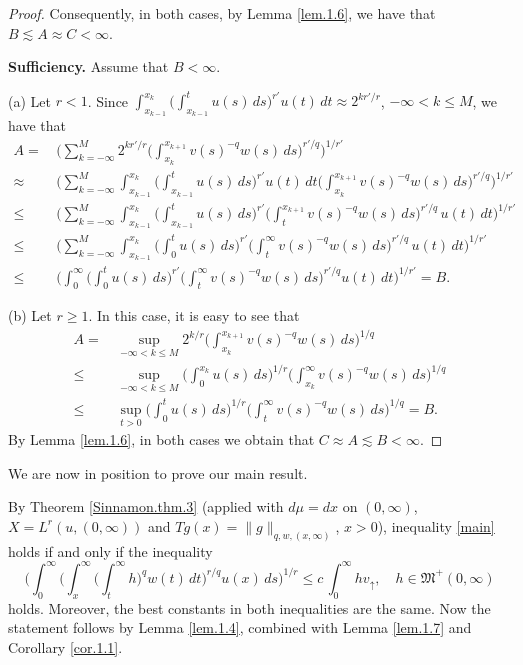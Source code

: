 \documentclass[12pt]{amsart}
\theoremstyle{plain}
\theoremstyle{definition}
\numberwithin{thm}{section}
\numberwithin{equation}{section}
\begin{document}
\begin{proof}
	Consequently, in both cases, by Lemma \ref{lem.1.6}, we have that $B \lesssim A \approx C < \infty$.
	
    {\bf Sufficiency.} Assume that $B < \infty$.
    
   	{\rm (a)} Let $r < 1$. Since $\int_{x_{k-1}}^{x_k} \bigg( \int_{x_{k-1}}^t u(s)\,ds \bigg)^{r'} u(t)\,dt \approx 2^{k r' / r}$, ${-\infty < k \le M}$, we have that
   	\begin{align*}
   	A = & \, \bigg( \sum_{k = -\infty}^M 2^{k r' / r} \bigg( \int_{x_k}^{x_{k+1}} v(s)^{-q} w(s)\,ds\bigg)^{ r' / q} \bigg)^{1/r'} \\
   	\approx & \, \bigg( \sum_{k = -\infty}^M \int_{x_{k-1}}^{x_k} \bigg( \int_{x_{k-1}}^t u(s)\,ds \bigg)^{r'} u(t)\,dt \bigg( \int_{x_k}^{x_{k+1}} v(s)^{-q} w(s)\,ds\bigg)^{ r' / q} \bigg)^{1/r'} \\
   	\le & \, \bigg( \sum_{k = -\infty}^M \int_{x_{k-1}}^{x_k} \bigg( \int_{x_{k-1}}^t u(s)\,ds \bigg)^{r'} \bigg( \int_t^{x_{k+1}} v(s)^{-q} w(s)\,ds\bigg)^{ r' / q} \,u(t)\,dt  \bigg)^{1/r'} \\
   	\le & \, \bigg( \sum_{k = -\infty}^M \int_{x_{k-1}}^{x_k} \bigg( \int_0^t u(s)\,ds \bigg)^{r'} \bigg( \int_t^{\infty} v(s)^{-q} w(s)\,ds\bigg)^{ r' / q} \,u(t)\,dt \bigg)^{1/r'} \\
   	\le & \, \bigg( \int_0^{\infty} \bigg( \int_0^t u(s)\,ds\bigg)^{r'} \bigg( \int_t^{\infty} v(s)^{-q} w(s)\,ds \bigg)^{ r' / q}u(t)\,dt \bigg)^{1/r'} = B.
   	\end{align*}
   	
	{\rm (b)} Let $r \ge 1$. In this case, it is easy to see that
	\begin{align*}
	A = & \, \sup_{-\infty < k \le M} 2^{k / r} \bigg( \int_{x_k}^{x_{k+1}} v(s)^{-q} w(s)\,ds\bigg)^{ 1 / q} \\
	\le & \, \sup_{-\infty < k \le M} \bigg( \int_0^{x_k} u(s)\,ds \bigg)^{1/ r}\bigg( \int_{x_k}^{\infty} v(s)^{-q} w(s)\,ds\bigg)^{ 1 / q} \\
	\le & \, \sup_{t > 0} \bigg( \int_0^t u(s)\,ds \bigg)^{1/ r} \bigg( \int_t^{\infty} v(s)^{-q} w(s)\,ds \bigg)^{ 1 / q} = B.
	\end{align*}
	By Lemma \ref{lem.1.6}, in both cases we obtain that $C \approx A \lesssim B < \infty$.
\end{proof}

We are now in position to prove our main result.

 By Theorem \ref{Sinnamon.thm.3} (applied with $d\mu = dx$ on ${(0,\infty)}$, $X = L^r(u,{(0,\infty)})$ and $Tg (x) = \|g\|_{q,w,(x,\infty)}$, $x > 0$), inequality \eqref{main} holds if and only if the inequality
\begin{equation}\label{main5}
\bigg( \int_0^{\infty} \bigg( \int_x^{\infty} \bigg( \int_t^{\infty} h \bigg)^q w(t)\,dt
\bigg)^{r / q} u(x)\,ds \bigg)^{1/r}\leq c \,\int_0^{\infty} h v_{\uparrow}, \quad h \in {\mathfrak M}^+(0,\infty)
\end{equation}
holds. Moreover, the best constants in both inequalities are the same. Now the statement follows by Lemma \ref{lem.1.4}, combined with Lemma \ref{lem.1.7} and Corollary \ref{cor.1.1}.
\end{document}
